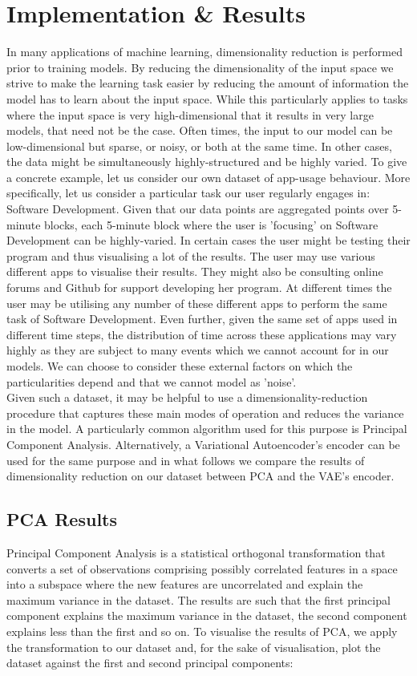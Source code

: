 \section{Implementation \& Results}
In many applications of machine learning, dimensionality reduction is performed prior to training models. By reducing the dimensionality of the input space we strive to make the learning task easier by reducing the amount of information the model has to learn about the input space. While this particularly applies to tasks where the input space is very high-dimensional that it results in very large models, that need not be the case. Often times, the input to our model can be low-dimensional but sparse, or noisy, or both at the same time. In other cases, the data might be simultaneously highly-structured and be highly varied. To give a concrete example, let us consider our own dataset of app-usage behaviour. More specifically, let us consider a particular task our user regularly engages in: Software Development. Given that our data points are aggregated points over 5-minute blocks, each 5-minute block where the user is 'focusing' on Software Development can be highly-varied. In certain cases the user might be testing their program and thus visualising a lot of the results. The user may use various different apps to visualise their results. They might also be consulting online forums and Github for support developing her program. At different times the user may be utilising any number of these different apps to perform the same task of Software Development. Even further, given the same set of apps used in different time steps, the distribution of time across these applications may vary highly as they are subject to many events which we cannot account for in our models. We can choose to consider these external factors on which the particularities depend and that we cannot model as 'noise'. \\

Given such a dataset, it may be helpful to use a dimensionality-reduction procedure that captures these main modes of operation and reduces the variance in the model. A particularly common algorithm used for this purpose is Principal Component Analysis. Alternatively, a Variational Autoencoder's encoder can be used for the same purpose and in what follows we compare the results of dimensionality reduction on our dataset between PCA and the VAE's encoder. 

\subsection{PCA Results}
Principal Component Analysis is a statistical orthogonal transformation that converts a set of observations comprising possibly correlated features in a space into a subspace where the new features are uncorrelated and explain the maximum variance in the dataset. The results are such that the first principal component explains the maximum variance in the dataset, the second component explains less than the first and so on. To visualise the results of PCA, we apply the transformation to our dataset and, for the sake of visualisation, plot the dataset against the first and second principal components:

